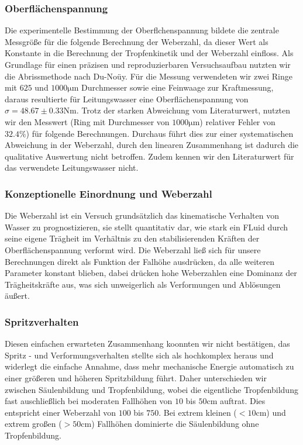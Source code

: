\documentclass[twocolumn,10pt]{extarticle}
\begin{document}
\subsubsection{Oberflächenspannung}
Die experimentelle Bestimmung der Oberflchenspannung bildete die zentrale Messgröße für die folgende Berechnung der Weberzahl, da dieser Wert als Konstante
in die Berechnung der Tropfenkinetik und der Weberzahl einfloss. Als Grundlage für einen präzisen und reproduzierbaren Versuchsaufbau nutzten wir die 
Abrissmethode nach Du-Noüy. Für die Messung verwendeten wir zwei Ringe mit $625$ und $1000\unit{\micro\meter}$ Durchmesser sowie eine Feinwaage zur Kraftmessung, daraus resultierte für Leitungswasser
eine Oberflächenspannung von $ \sigma = 48.67 \pm 0.33\unit{\newton\meter}$. Trotz der starken Abweichung vom Literaturwert, nutzten wir den Messwert (Ring mit Durchmesser von $1000\unit{\micro\meter}$) 
relativer Fehler von $32.4\%$) für folgende Berechnungen. Durchaus führt dies zur einer systematischen Abweichung in der Weberzahl, durch den linearen Zusammenhang ist dadurch die qualitative Auswertung nicht betroffen.
Zudem kennen wir den Literaturwert für das verwendete Leitungswasser nicht.
\subsubsection{Konzeptionelle Einordnung und Weberzahl}
Die Weberzahl ist ein Versuch grundsätzlich das kinematische Verhalten von Wasser zu prognostizieren, sie stellt quantitativ dar, wie stark ein FLuid durch seine eigene Trägheit im Verhältnis
zu den stabilisierenden Kräften der Oberflächenspannung verformt wird.
Die Weberzahl ließ sich für unsere Berechnungen direkt als Funktion der Falhöhe ausdrücken, da alle weiteren Parameter konstant blieben, dabei drücken hohe Weberzahlen eine Dominanz der 
Trägheitskräfte aus, was sich unweigerlich als Verformungen und Ablösungen äußert.
\subsubsection{Spritzverhalten}
Diesen einfachen erwarteten Zusammenhang koonnten wir nicht bestätigen,  das Spritz - und Verformungsverhalten stellte sich als hochkomplex heraus und widerlegt die einfache Annahme, 
dass mehr mechanische Energie automatisch zu einer größeren und höheren Spritzbildung führt. Daher unterschieden wir zwischen Säulenbildung und Tropfenbildung, wobei die eigentliche Tropfenbildung
fast auschließlich bei moderaten Fallhöhen von $10$ bis $50\unit{\centi\meter}$ auftrat. Dies entspricht einer Weberzahl von $100$ bis $750$. Bei extrem kleinen ($<10\unit{\centi\meter}$) und 
extrem großen ($>50\unit{\centi\meter}$) Fallhöhen dominierte die Säulenbildung ohne Tropfenbildung.
\end{document}
